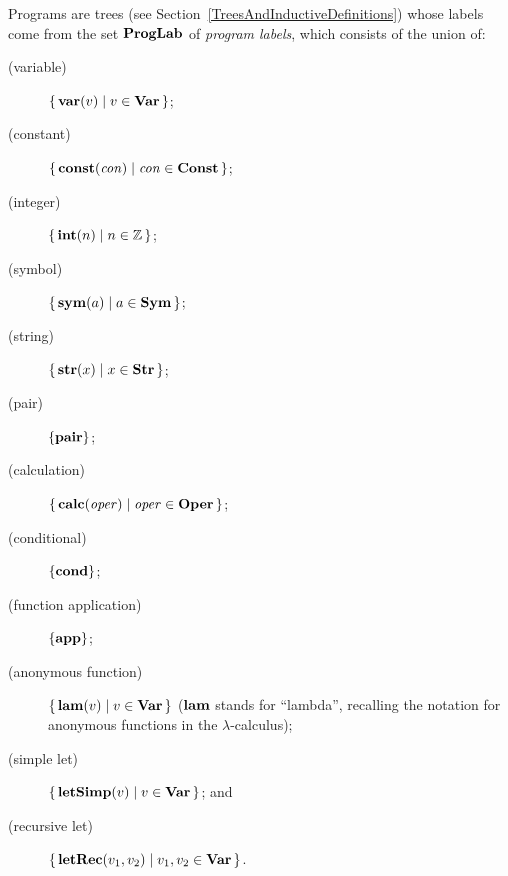 Programs are trees (see Section~\ref{TreesAndInductiveDefinitions})
whose labels come from the set $\mathbf{ProgLab}$ of \emph{program labels},
%
which consists of the union of:
\begin{description}
\item[\quad(variable)] $\{ \, \mathbf{var}(v) \mid v\in\mathbf{Var} \, \}$;

\item[\quad(constant)] $\{ \, \mathbf{const}(\mathit{con}) \mid \mathit{con}\in\mathbf{Const} \, \}$;

\item[\quad(integer)] $\{ \, \mathbf{int}(n) \mid n\in\mathbb{Z} \, \}$;

\item[\quad(symbol)] $\{ \, \mathbf{sym}(a) \mid a\in\mathbf{Sym} \, \}$;

\item[\quad(string)] $\{ \, \mathbf{str}(x) \mid x\in\mathbf{Str} \, \}$;

\item[\quad(pair)] $\{\mathbf{pair}\}$;

\item[\quad(calculation)]
  $\{ \, \mathbf{calc}(\mathit{oper}) \mid \mathit{oper}\in\mathbf{Oper} \, \}$;

\item[\quad(conditional)] $\{\mathbf{cond}\}$;

\item[\quad(function application)] $\{\mathbf{app}\}$;

\item[\quad(anonymous function)] $\{ \, \mathbf{lam}(v) \mid v\in\mathbf{Var} \, \}$
  ($\mathbf{lam}$ stands for ``lambda'', recalling the notation for
  anonymous functions in the $\lambda$-calculus);

\item[\quad(simple let)] $\{ \, \mathbf{letSimp}(v) \mid v\in\mathbf{Var} \, \}$; and

\item[\quad(recursive let)] $\{ \, \mathbf{letRec}(v_1,v_2) \mid v_1,v_2\in\mathbf{Var} \, \}$.
\end{description}

